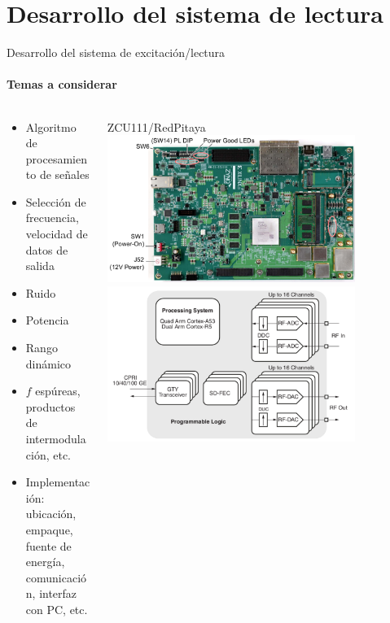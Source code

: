 \documentclass[ignorenonframetext,12pt]{beamer}
\begin{document}
\section{Desarrollo del sistema de lectura}
\begin{frame}{Desarrollo del sistema de excitación/lectura}
				\framesubtitle{Temas a considerar}
				\begin{columns}
								\begin{column}{0.5\textwidth}
				\normalsize{\begin{itemize}
								\item Algoritmo de procesamiento de señales
								\item Selección de frecuencia, velocidad de datos de salida
								\item Ruido
								\item Potencia
								\item Rango dinámico
								\item $f$ espúreas, productos de intermodulación, etc.
								\item Implementación: ubicación, empaque, fuente de
												energía, comunicación, interfaz con PC, etc.
				\end{itemize}}
								\end{column}
								\begin{column}{0.5\textwidth}
												ZCU111/RedPitaya
				\includegraphics[width=0.8\textwidth]{zcu2}
				\includegraphics[width=0.8\textwidth]{zcu1}

\end{column}
\end{columns}
\end{frame}
\end{document}
